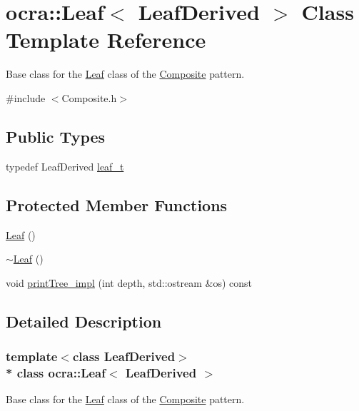 \hypertarget{classocra_1_1Leaf}{}\section{ocra\+:\+:Leaf$<$ Leaf\+Derived $>$ Class Template Reference}
\label{classocra_1_1Leaf}


Base class for the \hyperlink{classocra_1_1Leaf}{Leaf} class of the \hyperlink{classocra_1_1Composite}{Composite} pattern.  




{\ttfamily \#include $<$Composite.\+h$>$}

\subsection*{Public Types}
\begin{DoxyCompactItemize}
\item 
typedef Leaf\+Derived \hyperlink{classocra_1_1Leaf_ab2cc1a54ddf2da28942fa60c8da165f1}{leaf\+\_\+t}
\end{DoxyCompactItemize}
\subsection*{Protected Member Functions}
\begin{DoxyCompactItemize}
\item 
\hyperlink{classocra_1_1Leaf_a8c1c832842c03c2a0c24c2129ddbdc8a}{Leaf} ()
\item 
\hyperlink{classocra_1_1Leaf_a192f19a657e776a381da384279417f01}{$\sim$\+Leaf} ()
\item 
void \hyperlink{classocra_1_1Leaf_a5dda158daaaaad1340c92892afa6ba67}{print\+Tree\+\_\+impl} (int depth, std\+::ostream \&os) const 
\end{DoxyCompactItemize}


\subsection{Detailed Description}
\subsubsection*{template$<$class Leaf\+Derived$>$\\*
class ocra\+::\+Leaf$<$ Leaf\+Derived $>$}

Base class for the \hyperlink{classocra_1_1Leaf}{Leaf} class of the \hyperlink{classocra_1_1Composite}{Composite} pattern. 


